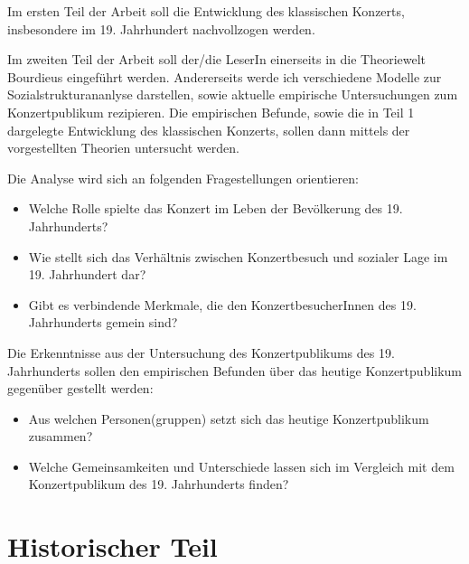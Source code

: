 \documentclass[a4paper, german, oneside]{scrbook}
\begin{document}
Im ersten Teil der Arbeit soll die Entwicklung des klassischen Konzerts, insbesondere im 19. Jahrhundert nachvollzogen werden. 

Im zweiten Teil der Arbeit soll der/die LeserIn einerseits in die Theoriewelt Bourdieus eingeführt werden. Andererseits werde ich verschiedene Modelle zur Sozialstrukturananlyse darstellen, sowie aktuelle empirische Untersuchungen zum Konzertpublikum rezipieren. Die empirischen Befunde, sowie die in Teil 1 dargelegte Entwicklung des klassischen Konzerts, sollen dann mittels der vorgestellten Theorien untersucht werden. 

Die Analyse wird sich an folgenden Fragestellungen orientieren:

\begin{itemize}
	\item Welche Rolle spielte das Konzert im Leben der Bevölkerung des 19. Jahrhunderts? %
	\item Wie stellt sich das Verhältnis zwischen Konzertbesuch und sozialer Lage im 19. Jahrhundert dar?
	\item Gibt es verbindende Merkmale, die den KonzertbesucherInnen des 19. Jahrhunderts gemein sind?
\end{itemize}

Die Erkenntnisse aus der Untersuchung des Konzertpublikums des 19. Jahrhunderts sollen den empirischen Befunden über das heutige Konzertpublikum gegenüber gestellt werden:

\begin{itemize}
	\item Aus welchen Personen(gruppen) setzt sich das heutige Konzertpublikum zusammen?
	\item Welche Gemeinsamkeiten und Unterschiede lassen sich im Vergleich mit dem Konzertpublikum des 19. Jahrhunderts finden?
\end{itemize}



\part{Historischer Teil}
\end{document}
